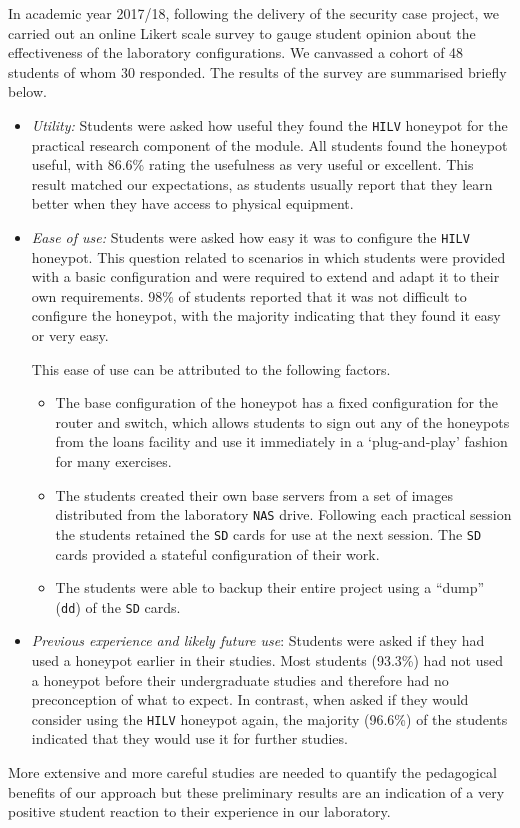 \documentclass{ieeeaccess}
\begin{document}
In academic year 2017/18, following the delivery of the security case project,
we carried out an online Likert scale survey to gauge student opinion about the effectiveness
of the laboratory configurations. We canvassed a cohort of 48 students of whom
30 responded. The results of the survey are summarised briefly below.
\begin{itemize}
  \item \noindent\emph{Utility:} Students were asked how useful they found the
\texttt{HILV} honeypot for the practical research component of the module. All
students found the honeypot useful, with 86.6\% rating the usefulness as very
useful or excellent. This result matched our expectations, as students usually
report that they learn better when they have access to physical equipment.
  \item \noindent\emph{Ease of use:} Students were asked how easy it was to
configure the \texttt{HILV} honeypot. This question related to scenarios in
which students were provided with a basic configuration and were required to
extend and adapt it to their own requirements. 98\% of students reported that
it was not difficult to configure the honeypot, with the majority indicating
that they found it easy or very easy.
\par\noindent This ease of use can be attributed to the following factors.
  \begin{itemize} 
    \item The base configuration of the honeypot has a fixed configuration for
      the router and switch, which allows students to sign out any of the
      honeypots from the loans facility and use it immediately in a
      `plug-and-play' fashion for many exercises.  
    \item The students created their own base servers from a set of images
      distributed from the laboratory \texttt{NAS} drive.  Following each
      practical session the students retained the \texttt{SD} cards for use at
      the next session. The \texttt{SD} cards provided a stateful configuration
      of their work.  
    \item The students were able to backup their entire project using a ``dump''
      (\texttt{dd}) of the \texttt{SD} cards.
  \end{itemize}
  \item \noindent\emph{Previous experience and likely future use}: Students
were asked if they had used a honeypot earlier in their studies. Most students
(93.3\%) had not used a honeypot before their undergraduate studies and
therefore had no preconception of what to expect. In contrast, when asked if
they would consider using the \texttt{HILV} honeypot again, the majority
(96.6\%) of the students indicated that they would use it for further studies. 
\end{itemize}
More extensive and more careful studies are needed to quantify the 
pedagogical benefits of our approach but these preliminary results are an 
indication of a very positive student reaction to their experience in our
laboratory.
\end{document}
